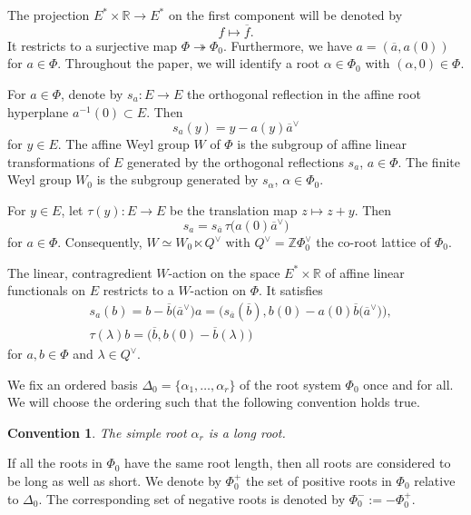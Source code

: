 \documentclass[11pt]{article}
\numberwithin{equation}{section}
\numberwithin{equation}{section}
\newtheorem{Convention}[Theorem]{Convention}
\begin{document}
The projection $E^*\times\mathbb{R}\rightarrow E^*$ on the first component will be denoted by
\[
f\mapsto\overline{f}.
\]
It restricts to a surjective map $\Phi\twoheadrightarrow\Phi_0$. Furthermore, we have $a=(\overline{a},a(0))$ for $a\in\Phi$.
Throughout the paper, we will identify a root $\alpha\in\Phi_0$ with $(\alpha,0)\in\Phi$.

For $a\in\Phi$, denote by $s_a\colon E\rightarrow E$ the orthogonal reflection in the affine root hyperplane $a^{-1}(0)\subset E$. Then
\begin{equation*}%
s_a(y)=y-a(y)\overline{a}^\vee
\end{equation*}
for $y\in E$.
The affine Weyl group $W$ of $\Phi$ is the subgroup of affine linear transformations of $E$ generated by the orthogonal reflections $s_a$, $a\in\Phi$. The finite Weyl group $W_0$ is the subgroup generated by $s_\alpha$, $\alpha\in\Phi_0$.

For $y\in E$, let $\tau(y)\colon E\rightarrow E$ be the translation map $z\mapsto z+y$. Then
\begin{equation}\label{ssplit}
s_a=s_{\overline{a}}\,\tau\bigl(a(0)\overline{a}^\vee\bigr)
\end{equation}
for $a\in\Phi$. Consequently,
$W\simeq W_0\ltimes Q^\vee$ with $Q^\vee=\mathbb{Z}\Phi_0^\vee$ the co-root lattice of $\Phi_0$.

The linear, contragredient $W$-action
on the space $E^*\times\mathbb{R}$ of affine linear functionals on $E$ restricts to a $W$-action on $\Phi$. It satisfies
\begin{align}
&s_a(b)=b-\overline{b}\bigl(\overline{a}^\vee\bigr)a=\bigl(s_{\overline{a}}(\overline{b}),b(0)-a(0)\overline{b}\bigl(\overline{a}^\vee\bigr)\bigr),\nonumber\\
&\tau(\lambda)b=\bigl(\overline{b},b(0)-\overline{b}(\lambda)\bigr)\label{WPhiaction}
\end{align}
for $a,b\in\Phi$ and $\lambda\in Q^\vee$.

We fix an ordered basis $\Delta_0=\{\alpha_1,\dots,\alpha_r\}$ of the root system $\Phi_0$ once and for all. We will choose the ordering such that the following convention
holds true.

\begin{Convention}\label{root_length_convention}
The simple root $\alpha_r$ is a long root.
\end{Convention}

If all the roots in $\Phi_0$ have the same root length, then all roots are considered to be long as well as short.
We denote by $\Phi_0^{+}$ the set of positive roots in $\Phi_0$ relative to $\Delta_0$. The corresponding set of negative roots is denoted by $\Phi_0^-:=-\Phi_0^+$.
\end{document}
